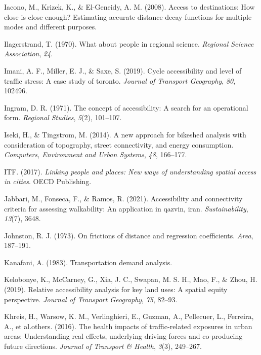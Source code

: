 \documentclass[
11pt, %
oneside, %
english, %
singlespacing, %
]{macthesis} %
\newlength{\cslhangindent}
\newenvironment{CSLReferences}[2] %
 {%
  \setlength{\parindent}{0pt}
  \ifodd #1 \everypar{\setlength{\hangindent}{\cslhangindent}}\ignorespaces\fi
  \ifnum #2 > 0
  \setlength{\parskip}{#2\baselineskip}
  \fi
 }%
 {}
\begin{document}
\begin{CSLReferences}{1}{0}
\leavevmode{}%
Iacono, M., Krizek, K., \& El-Geneidy, A. M. (2008). Access to destinations: How close is close enough? Estimating accurate distance decay functions for multiple modes and different purposes.

\leavevmode{}%
Ilagcrstrand, T. (1970). What about people in regional science. \emph{Regional Science Association}, \emph{24}.

\leavevmode{}%
Imani, A. F., Miller, E. J., \& Saxe, S. (2019). Cycle accessibility and level of traffic stress: A case study of toronto. \emph{Journal of Transport Geography}, \emph{80}, 102496.

\leavevmode{}%
Ingram, D. R. (1971). The concept of accessibility: A search for an operational form. \emph{Regional Studies}, \emph{5}(2), 101--107.

\leavevmode{}%
Iseki, H., \& Tingstrom, M. (2014). A new approach for bikeshed analysis with consideration of topography, street connectivity, and energy consumption. \emph{Computers, Environment and Urban Systems}, \emph{48}, 166--177.

\leavevmode{}%
ITF. (2017). \emph{Linking people and places: New ways of understanding spatial access in cities}. OECD Publishing.

\leavevmode{}%
Jabbari, M., Fonseca, F., \& Ramos, R. (2021). Accessibility and connectivity criteria for assessing walkability: An application in qazvin, iran. \emph{Sustainability}, \emph{13}(7), 3648.

\leavevmode{}%
Johnston, R. J. (1973). On frictions of distance and regression coefficients. \emph{Area}, 187--191.

\leavevmode{}%
Kanafani, A. (1983). Transportation demand analysis.

\leavevmode{}%
Kelobonye, K., McCarney, G., Xia, J. C., Swapan, M. S. H., Mao, F., \& Zhou, H. (2019). Relative accessibility analysis for key land uses: A spatial equity perspective. \emph{Journal of Transport Geography}, \emph{75}, 82--93.

\leavevmode{}%
Khreis, H., Warsow, K. M., Verlinghieri, E., Guzman, A., Pellecuer, L., Ferreira, A., et al.others. (2016). The health impacts of traffic-related exposures in urban areas: Understanding real effects, underlying driving forces and co-producing future directions. \emph{Journal of Transport \& Health}, \emph{3}(3), 249--267.


\end{CSLReferences}
\end{document}
